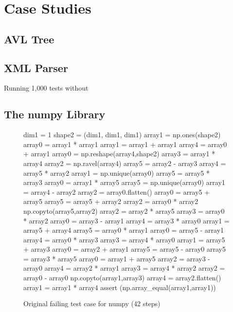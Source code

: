 \section {Case Studies}

\subsection{AVL Tree}

\subsection{XML Parser}

Running 1,000 tests without 

\subsection{The numpy Library}

\begin{figure}
{\scriptsize
\begin{code}
 dim1 = 1 
 shape2 = (dim1, dim1, dim1) 
 array1 = np.ones(shape2) 
 array0 = array1 * array1 
 array1 = array1 + array1 
 array4 = array0 + array1 
 array0 = np.reshape(array4,shape2) 
 array3 = array1 * array4 
 array2 = np.ravel(array4) 
 array5 = array2 - array3 
 array4 = array5 * array2 
 array1 = np.unique(array0) 
 array5 = array5 * array3 
 array0 = array1 * array5 
 array5 = np.unique(array0) 
 array1 = array4 - array2 
 array2 = array0.flatten() 
 array0 = array5 + array5 
 array5 = array5 + array2 
 array2 = array0 * array2 
 np.copyto(array5,array2) 
 array2 = array2 * array5 
 array3 = array0 * array2 
 array0 = array3 - array1 
 array4 = array3 * array0 
 array1 = array5 + array4 
 array5 = array0 * array1 
 array0 = array5 - array1 
 array4 = array0 * array3 
 array3 = array4 * array0 
 array1 = array5 + array3 
 array0 = array2 + array1 
 array5 = array5 - array0 
 array5 = array3 * array5 
 array0 = array1 + array5 
 array2 = array3 - array0 
 array4 = array2 * array1 
 array3 = array4 * array2 
 array2 = array0 - array0 
 np.copyto(array1,array3) 
 array4 = array2.flatten() 
 array1 = array1 * array4
 assert (np.array\_equal(array1,array1))
\end{code}
}
\caption{Original failing test case for numpy (42 steps)}
\end{figure}

